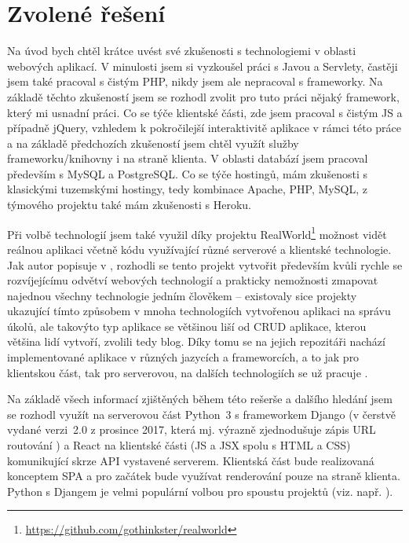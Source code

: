     \section{Zvolené řešení}\label{reseni}
    Na úvod bych chtěl krátce uvést své zkušenosti s technologiemi v oblasti webových aplikací. V minulosti jsem si vyzkoušel práci s Javou a Servlety, častěji jsem také pracoval s čistým PHP, nikdy jsem ale nepracoval s frameworky. Na základě těchto zkušeností jsem se rozhodl zvolit pro tuto práci nějaký framework, který mi usnadní práci. Co se týče klientské části, zde jsem pracoval s čistým JS a případně jQuery, vzhledem k pokročilejší interaktivitě aplikace v rámci této práce a na základě předchozích zkušeností jsem chtěl využít služby frameworku/knihovny i na straně klienta. V oblasti databází jsem pracoval především s MySQL a PostgreSQL. Co se týče hostingů, mám zkušenosti s klasickými tuzemskými hostingy, tedy kombinace Apache, PHP, MySQL, z týmového projektu také mám zkušenosti s Heroku.
    
    Při volbě technologií jsem také využil díky projektu RealWorld\footnote{\url{https://github.com/gothinkster/realworld}} možnost vidět reálnou aplikaci včetně kódu využívající různé serverové a klientské technologie. Jak autor popisuje v \cite{realworld}, rozhodli se tento projekt vytvořit především kvůli rychle se rozvíjejícímu odvětví webových technologií a prakticky nemožnosti zmapovat najednou všechny technologie jedním člověkem -- existovaly sice projekty ukazující tímto způsobem v mnoha technologiích vytvořenou aplikaci na správu úkolů, ale takovýto typ aplikace se většinou liší od CRUD aplikace, kterou většina lidí vytvoří, zvolili tedy blog. Díky tomu se na jejich repozitáři nachází implementované aplikace v různých jazycích a frameworcích, a to jak pro klientskou část, tak pro serverovou, na dalších technologiích se už pracuje \cite{realworld-git}.
    
    Na základě všech informací zjištěných během této rešerše a dalšího hledání jsem se rozhodl využít na serverovou část Python~3 s frameworkem Django (v čerstvě vydané verzi~2.0 z prosince 2017, která mj. výrazně zjednodušuje zápis URL routování \cite{django2}) a React na klientské části (JS a JSX spolu s HTML a CSS) komunikující skrze API vystavené serverem. Klientská část bude realizovaná konceptem SPA a pro začátek bude využívat renderování pouze na straně klienta. Python s Djangem je velmi populární volbou pro spoustu projektů (viz. např. \cite{stack-stats18}).
    
